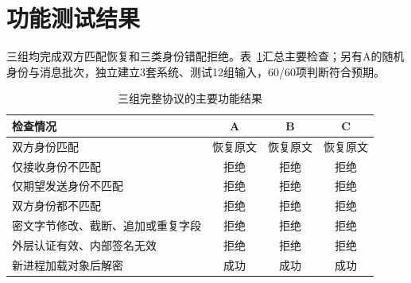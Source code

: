 \section{功能测试结果}
三组均完成双方匹配恢复和三类身份错配拒绝。表~\ref{tab:functional}汇总主要检查；另有A的随机身份与消息批次，独立建立3套系统、测试12组输入，60/60项判断符合预期。

\begin{table}[H]
\centering\small
\caption{三组完整协议的主要功能结果}
\label{tab:functional}
\begin{tabularx}{\textwidth}{@{}Xccc@{}}
\toprule
\rowcolor{black!8} 检查情况 & A & B & C \\
\midrule
双方身份匹配 & 恢复原文 & 恢复原文 & 恢复原文 \\
仅接收身份不匹配 & 拒绝 & 拒绝 & 拒绝 \\
仅期望发送身份不匹配 & 拒绝 & 拒绝 & 拒绝 \\
双方身份都不匹配 & 拒绝 & 拒绝 & 拒绝 \\
密文字节修改、截断、追加或重复字段 & 拒绝 & 拒绝 & 拒绝 \\
外层认证有效、内部签名无效 & 拒绝 & 拒绝 & 拒绝 \\
新进程加载对象后解密 & 成功 & 成功 & 成功 \\
\bottomrule
\end{tabularx}
\end{table}
